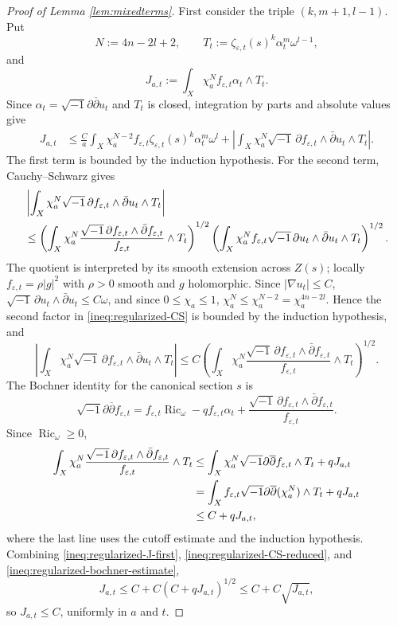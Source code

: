 \documentclass[10pt,a4paper]{amsart}
\newcommand{\Ric}{\operatorname{Ric}}
\renewcommand{\d}{\partial}
\newcommand{\ddbar}{\sqrt{-1}\d\overline{\d}}
\newcommand{\vep}{\varepsilon}
\begin{document}
\begin{proof}[Proof of Lemma \ref{lem:mixedterms}]
First consider the triple $(k,m+1,l-1)$.  Put
\[
        N:=4n-2l+2,
        \qquad
        T_t:=\zeta_{\vep,t}(s)^k\alpha_t^m\omega^{l-1},
\]
and
\[
        J_{a,t}:=\int_X\chi_a^N f_{\vep,t}\alpha_t\wedge T_t .
\]
Since $\alpha_t=\ddbar u_t$ and $T_t$ is closed, integration by parts and absolute values give
\begin{align}
J_{a,t}
&\leq \frac{C}{a}\int_X\chi_a^{N-2}f_{\vep,t}\zeta_{\vep,t}(s)^k\alpha_t^m\omega^l
+
\left|\int_X\chi_a^N\sqrt{-1}\,\partial f_{\vep,t}\wedge\bar\partial u_t\wedge T_t\right| .
\label{ineq:regularized-J-first}
\end{align}
The first term is bounded by the induction hypothesis.  For the second term, Cauchy--Schwarz gives
\begin{align}
&\left|\int_X\chi_a^N\sqrt{-1}\,\partial f_{\vep,t}\wedge\bar\partial u_t\wedge T_t\right|        \notag\\
&\leq
\left(\int_X\chi_a^N
\frac{\sqrt{-1}\,\partial f_{\vep,t}\wedge\bar\partial f_{\vep,t}}{f_{\vep,t}}
\wedge T_t\right)^{1/2}
\left(\int_X\chi_a^N f_{\vep,t}\sqrt{-1}\,\partial u_t\wedge\bar\partial u_t\wedge T_t\right)^{1/2}.
\label{ineq:regularized-CS}
\end{align}
The quotient is interpreted by its smooth extension across $Z(s)$; locally $f_{\vep,t}=\rho |g|^2$ with $\rho>0$ smooth and $g$ holomorphic.  Since $|\nabla u_t|\leq C$,
$\sqrt{-1}\,\partial u_t\wedge\bar\partial u_t\leq C\omega$, and since $0\leq\chi_a\leq1$,
$\chi_a^N\leq\chi_a^{N-2}=\chi_a^{4n-2l}$.  Hence the second factor in \eqref{ineq:regularized-CS} is bounded by the induction hypothesis, and
\begin{equation}\label{ineq:regularized-CS-reduced}
\left|\int_X\chi_a^N\sqrt{-1}\,\partial f_{\vep,t}\wedge\bar\partial u_t\wedge T_t\right|
\leq
C\left(\int_X\chi_a^N
\frac{\sqrt{-1}\,\partial f_{\vep,t}\wedge\bar\partial f_{\vep,t}}{f_{\vep,t}}
\wedge T_t\right)^{1/2}.
\end{equation}
The Bochner identity for the canonical section $s$ is
\[
\ddbar f_{\vep,t}
=f_{\vep,t}\Ric_\omega-qf_{\vep,t}\alpha_t
+\frac{\sqrt{-1}\,\partial f_{\vep,t}\wedge\bar\partial f_{\vep,t}}{f_{\vep,t}}.
\]
Since $\Ric_\omega\geq0$,
\begin{align}
\int_X\chi_a^N
\frac{\sqrt{-1}\,\partial f_{\vep,t}\wedge\bar\partial f_{\vep,t}}{f_{\vep,t}}\wedge T_t
&\leq
\int_X\chi_a^N\ddbar f_{\vep,t}\wedge T_t+qJ_{a,t}                                      \notag\\
&=\int_X f_{\vep,t}\ddbar(\chi_a^N)\wedge T_t+qJ_{a,t}                                  \notag\\
&\leq C+qJ_{a,t},\label{ineq:regularized-bochner-estimate}
\end{align}
where the last line uses the cutoff estimate and the induction hypothesis.  Combining \eqref{ineq:regularized-J-first}, \eqref{ineq:regularized-CS-reduced}, and \eqref{ineq:regularized-bochner-estimate},
\[
        J_{a,t}\leq C+C(C+qJ_{a,t})^{1/2}\leq C+C\sqrt{J_{a,t}},
\]
so $J_{a,t}\leq C$, uniformly in $a$ and $t$.


\end{proof}
\end{document}
